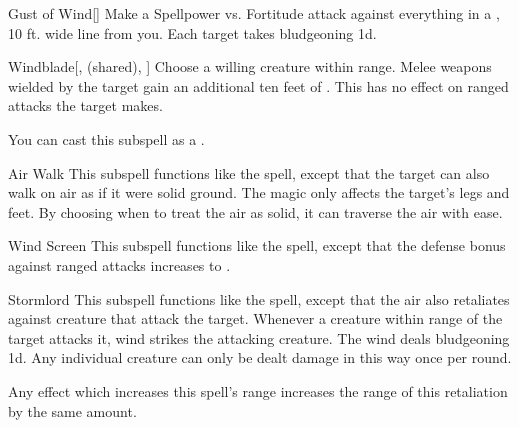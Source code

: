 \begin{ability}[\nth{3}]{Gust of Wind}[]
Make a Spellpower vs. Fortitude attack against everything in a \arealarge, 10 ft. wide line from you.
\hit Each target takes bludgeoning  \minus1d.
\end{ability}
\vspace{0.25em}


\begin{ability}[\nth{3}]{Windblade}[,  (shared), ]
Choose a willing creature within \rngclose range.
Melee weapons wielded by the target gain an additional ten feet of .
This has no effect on ranged attacks the target makes.

You can cast this subspell as a .
\end{ability}
\vspace{0.25em}


\begin{ability}[\nth{4}]{Air Walk}
This subspell functions like the  spell, except that the target can also walk on air as if it were solid ground.
The magic only affects the target's legs and feet.
By choosing when to treat the air as solid, it can traverse the air with ease.
\end{ability}
\vspace{0.25em}


\begin{ability}[\nth{4}]{Wind Screen}
This subspell functions like the  spell, except that the defense bonus against ranged attacks increases to .
\end{ability}
\vspace{0.25em}


\begin{ability}[\nth{5}]{Stormlord}
This subspell functions like the  spell, except that the air also retaliates against creature that attack the target.
Whenever a creature within \rngclose range of the target attacks it, wind strikes the attacking creature.
The wind deals bludgeoning  \minus1d.
Any individual creature can only be dealt damage in this way once per round.

Any effect which increases this spell's range increases the range of this retaliation by the same amount.
\end{ability}
\vspace{0.25em}


